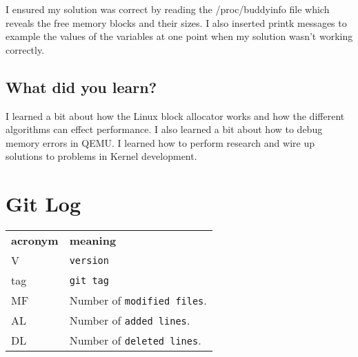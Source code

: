 \documentclass[draftclsnofoot,onecolumn]{IEEEtran}
\begin{document}
I ensured my solution was correct by reading the /proc/buddyinfo file which reveals the free memory blocks and their sizes. I also inserted printk messages to example the values of the variables at one point when my solution wasn't working correctly.

\subsection{What did you learn?}

I learned a bit about how the Linux block allocator works and how the different algorithms can effect performance. I also learned a bit about how to debug memory errors in QEMU. I learned how to perform research and wire up solutions to problems in Kernel development.

\section{Git Log}

\begin{tabular}{lp{12cm}}
  \label{tabular:legend:git-log}
  \textbf{acronym} & \textbf{meaning} \\
  V & \texttt{version} \\
  tag & \texttt{git tag} \\
  MF & Number of \texttt{modified files}. \\
  AL & Number of \texttt{added lines}. \\
  DL & Number of \texttt{deleted lines}. \\
\end{tabular}

\bigskip
\end{document}
